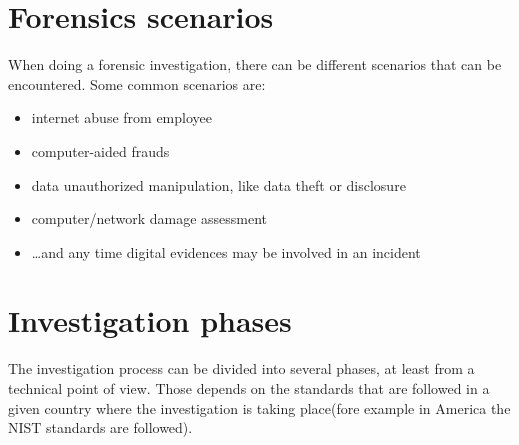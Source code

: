 \section{Forensics scenarios}
When doing a forensic investigation, there can be different scenarios
that can be encountered. Some common scenarios are:
\begin{itemize}
  \item internet abuse from employee
  \item computer-aided frauds
  \item data unauthorized manipulation, like data theft or disclosure
  \item computer/network damage assessment
  \item …and any time digital evidences may be involved in an incident
\end{itemize}
\section{Investigation phases}
The investigation process can be divided into several phases, at least
from a technical point of view. Those depends on the standards that
are followed in a given country where the investigation is taking 
place(fore example in America the NIST standards are followed).
